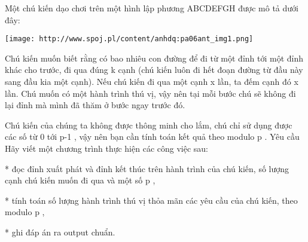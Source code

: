 Một chú kiến dạo chơi trên một hình lập phương ABCDEFGH được mô tả dưới đây:   



\texttt{[image: http://www.spoj.pl/content/anhdq:pa06ant\_img1.png]}



   Chú kiến muốn biết rằng có bao nhiêu con đường để đi từ một đỉnh tới một đỉnh khác cho trước, đi qua đúng       k      cạnh (chú kiến luôn đi hết đoạn đường từ đầu này sang đầu kia một cạnh). Nếu chú kiến đi qua một cạnh       x      lần, ta đếm cạnh đó       x      lần. Chú muốn có một hành trình thú vị, vậy nên tại mỗi bước chú sẽ không đi lại đỉnh mà mình đã thăm ở bước ngay trước đó.  

   Chú kiến của chúng ta không được thông minh cho lắm, chú chỉ sử dụng được các số từ       0      tới       p-1      , vậy nên bạn cần tính toán kết quả theo modulo       p      .
Yêu cầu
Hãy viết một chương trình thực hiện các công việc sau:   


   * đọc đỉnh xuất phát và đỉnh kết thúc trên hành trình của chú kiến, số lượng cạnh chú kiến muốn đi qua và một số       p      ,   


   * tính toán số lượng hành trình thú vị thỏa mãn các yêu cầu của chú kiến, theo modulo       p      ,   


   * ghi đáp án ra output chuẩn.